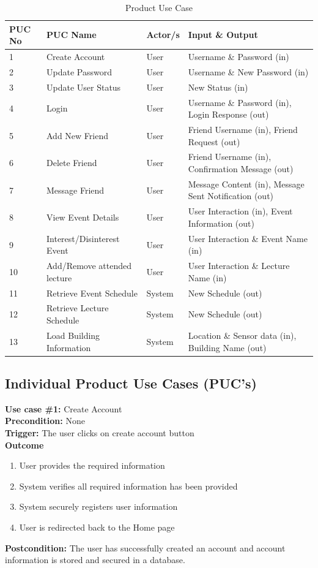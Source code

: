 \documentclass[12pt]{article}
\begin{document}
\begin{longtable}
 {p{} | p{} | p{} | p{}}\caption{Product Use Case} \label{TblPUC}\\
  \toprule
  \textbf{PUC No} & \textbf{PUC Name} & \textbf{Actor/s} & \textbf{Input \& Output}\\
  \midrule
  1 & Create Account & User & Username \& Password (in)\\
  \midrule
  2 & Update Password & User & Username \& New Password (in)\\
  \midrule
  3 & Update User Status & User & New Status (in)\\
  \midrule
  4 & Login & User & Username \& Password (in), Login Response (out)\\
   \midrule
  5 & Add New Friend & User & Friend Username (in), Friend Request (out)\\
  \midrule
  6 & Delete Friend & User & Friend Username (in), Confirmation Message (out)\\
  \midrule
  7 & Message Friend & User & Message Content (in), Message Sent Notification (out)\\
  \midrule
  8 & View Event Details & User & User Interaction (in), Event Information (out)\\
  \midrule
  9 & Interest/Disinterest Event & User & User Interaction \& Event Name (in)\\
  \midrule
  10 & Add/Remove attended lecture & User & User Interaction \& Lecture Name (in)\\
  \midrule
  11 & Retrieve Event Schedule & System & New Schedule (out)\\
  \midrule
  12 & Retrieve Lecture Schedule & System & New Schedule (out)\\
  \midrule
  13 & Load Building Information & System & Location \& Sensor data (in),  Building Name (out)\\
  \bottomrule
\end{longtable}

\subsection{Individual Product Use Cases (PUC's)}
\textbf{Use case \#1:} Create Account\\
\textbf{Precondition:} None\\
\textbf{Trigger:} The user clicks on create account button\\
\textbf{Outcome}
\begin{enumerate}
    \item User provides the required information
    \item System verifies all required information has been provided
    \item System securely registers user information
    \item User is redirected back to the Home page
\end{enumerate}
\textbf{Postcondition:} The user has successfully created an account and account information is stored and secured in a database.
\end{document}
